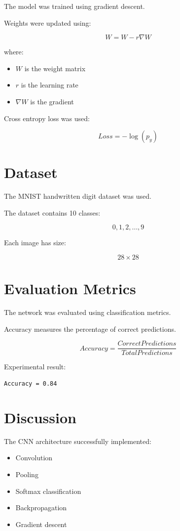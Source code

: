 \documentclass{article}
\begin{document}
The model was trained using gradient descent.

Weights were updated using:

\[
W = W - r \nabla W
\]

where:
\begin{itemize}
    \item $W$ is the weight matrix
    \item $r$ is the learning rate
    \item $\nabla W$ is the gradient
\end{itemize}

Cross entropy loss was used:

\[
Loss = -\log(p_y)
\]

\section{Dataset}

The MNIST handwritten digit dataset was used.

The dataset contains 10 classes:

\[
0,1,2,\dots,9
\]

Each image has size:

\[
28 \times 28
\]

\section{Evaluation Metrics}

The network was evaluated using classification
metrics.

Accuracy measures the percentage of correct
predictions.

\[
Accuracy=
\frac{Correct Predictions}
{Total Predictions}
\]

Experimental result:

\begin{verbatim}
Accuracy = 0.84
\end{verbatim}

\section{Discussion}

The CNN architecture successfully implemented:

\begin{itemize}
    \item Convolution
    \item Pooling
    \item Softmax classification
    \item Backpropagation
    \item Gradient descent
\end{itemize}
\end{document}
